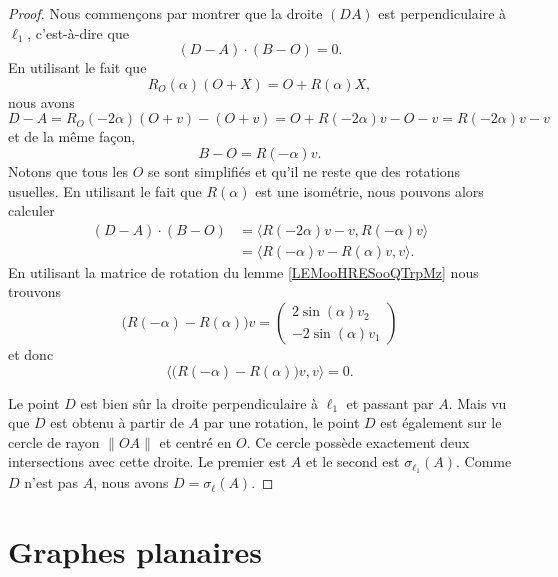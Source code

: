 \begin{proof}
	Nous commençons par montrer que la droite \( (DA)\) est perpendiculaire à \( \ell_1\), c'est-à-dire que
	\begin{equation}
		(D-A)\cdot (B-O)=0.
	\end{equation}
	En utilisant le fait que
	\begin{equation}
		R_O(\alpha)(O+X)=O+R(\alpha)X,
	\end{equation}
	nous avons
	\begin{equation}
		D-A=R_O(-2\alpha)(O+v)-(O+v)=O+R(-2\alpha)v-O-v=R(-2\alpha)v-v
	\end{equation}
	et de la même façon,
	\begin{equation}
		B-O=R(-\alpha)v.
	\end{equation}
	Notons que tous les \( O\) se sont simplifiés et qu'il ne reste que des rotations usuelles. En utilisant le fait que \( R(\alpha)\) est une isométrie, nous pouvons alors calculer
	\begin{subequations}
		\begin{align}
			(D-A)\cdot (B-O) & =\langle R(-2\alpha)v-v, R(-\alpha)v\rangle \\
			                 & =\langle R(-\alpha)v-R(\alpha)v, v\rangle.
		\end{align}
	\end{subequations}
	En utilisant la matrice de rotation du lemme \ref{LEMooHRESooQTrpMz} nous trouvons
	\begin{equation}
		\big( R(-\alpha)-R(\alpha) \big)v=\begin{pmatrix}
			2\sin(\alpha)v_2 \\
			-2\sin(\alpha)v_1
		\end{pmatrix}
	\end{equation}
	et donc
	\begin{equation}
		\langle  \big( R(-\alpha)-R(\alpha) \big)v  , v\rangle =0.
	\end{equation}

	Le point \( D\) est bien sûr la droite perpendiculaire à \( \ell_1\) et passant par \( A\). Mais vu que \( D\) est obtenu à partir de \( A\) par une rotation, le point \( D\) est également sur le cercle de rayon \( \| OA \|\) et centré en \( O\). Ce cercle possède exactement deux intersections avec cette droite. Le premier est \( A\) et le second est \( \sigma_{\ell_1}(A)\). Comme \( D\) n'est pas \( A\), nous avons \( D=\sigma_{\ell}(A)\).
\end{proof}

\section{Graphes planaires}

